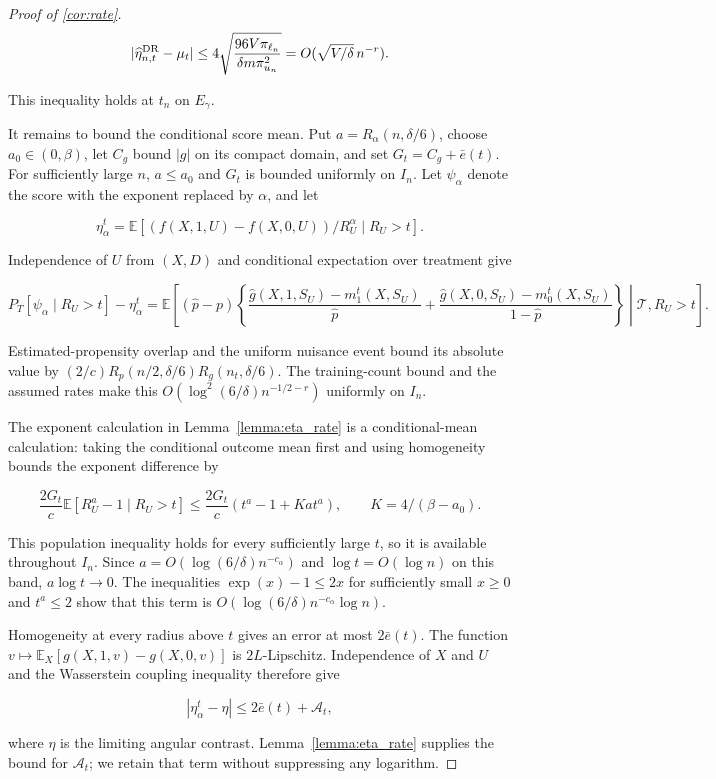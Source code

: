 \documentclass[12pt]{article}
\theoremstyle{plain}
\theoremstyle{definition}
\begin{document}
\begin{proof}[Proof of \cref{cor:rate}]
\[
|\widehat\eta_{n,t}^{\operatorname{DR}}-\mu_t|\leq4\sqrt{\frac{96V\pi_{\ell_n}}{\delta m\pi_{u_n}^2}}=O(\sqrt{V/\delta}\,n^{-r}).
\]

This inequality holds at $t_n$ on $E_\gamma$. 

It remains to bound the conditional score mean. Put $a=R_\alpha(n,\delta/6)$, choose $a_0\in(0,\beta)$, let $C_g$ bound $|g|$ on its compact domain, and set $G_t=C_g+\bar e(t)$. For sufficiently large $n$, $a\leq a_0$ and $G_t$ is bounded uniformly on $I_n$. Let $\psi_\alpha$ denote the score with the exponent replaced by $\alpha$, and let

\[
\eta_\alpha^t=\mathbb E[(f(X,1,U)-f(X,0,U))/R_U^\alpha\mid R_U>t].
\]

Independence of $U$ from $(X,D)$ and conditional expectation over treatment give

\[
P_T[\psi_\alpha\mid R_U>t]-\eta_\alpha^t=\mathbb E\left[(\hat p-p)\left\{\frac{\hat g(X,1,S_U)-m_1^t(X,S_U)}{\hat p}+\frac{\hat g(X,0,S_U)-m_0^t(X,S_U)}{1-\hat p}\right\}\middle|\mathcal T,R_U>t\right].
\]

Estimated-propensity overlap and the uniform nuisance event bound its absolute value by $(2/c)R_p(n/2,\delta/6)R_g(n_t,\delta/6)$. The training-count bound and the assumed rates make this $O(\log^2(6/\delta)n^{-1/2-r})$ uniformly on $I_n$. 

The exponent calculation in Lemma~\ref{lemma:eta_rate} is a conditional-mean calculation: taking the conditional outcome mean first and using homogeneity bounds the exponent difference by

\[
\frac{2G_t}{c}\mathbb E[R_U^a-1\mid R_U>t]\leq\frac{2G_t}{c}(t^a-1+Kat^a),\qquad K=4/(\beta-a_0).
\]

This population inequality holds for every sufficiently large $t$, so it is available throughout $I_n$. Since $a=O(\log(6/\delta)n^{-c_\alpha})$ and $\log t=O(\log n)$ on this band, $a\log t\to0$. The inequalities $\exp(x)-1\leq2x$ for sufficiently small $x\geq0$ and $t^a\leq2$ show that this term is $O(\log(6/\delta)n^{-c_\alpha}\log n)$. 

Homogeneity at every radius above $t$ gives an error at most $2\bar e(t)$. The function $v\mapsto\mathbb E_X[g(X,1,v)-g(X,0,v)]$ is $2L$-Lipschitz. Independence of $X$ and $U$ and the Wasserstein coupling inequality therefore give

\[
|\eta_\alpha^t-\eta|\leq2\bar e(t)+\mathcal A_t,
\]

where $\eta$ is the limiting angular contrast. Lemma~\ref{lemma:eta_rate} supplies the bound for $\mathcal A_t$; we retain that term without suppressing any logarithm. 


\end{proof}
\end{document}

